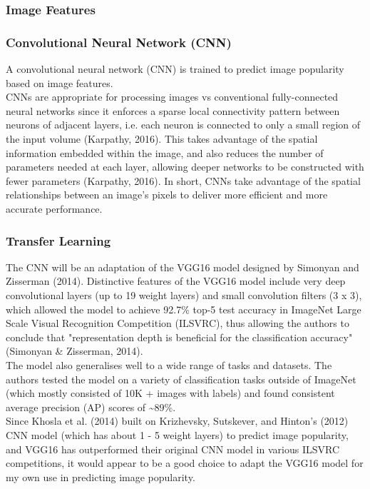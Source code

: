 \documentclass[11pt]{article}
\begin{document}
\subsubsection{Image Features}

\subsubsection*{Convolutional Neural Network (CNN)}

A convolutional neural network (CNN) is trained to predict image
popularity based on image features.\\

CNNs are appropriate for processing images vs conventional
fully-connected neural networks since it enforces a sparse local
connectivity pattern between neurons of adjacent layers, i.e. each
neuron is connected to only a small region of the input volume
(Karpathy, 2016). This takes advantage of the spatial information
embedded within the image, and also reduces the number of parameters
needed at each layer, allowing deeper networks to be constructed with
fewer parameters (Karpathy, 2016). In short, CNNs take advantage of the spatial relationships between an
image's pixels to deliver more efficient and more accurate performance.

\subsubsection*{Transfer Learning}

The CNN will be an adaptation of the VGG16 model designed by Simonyan
and Zisserman (2014). Distinctive features of the VGG16 model include
very deep convolutional layers (up to 19 weight layers) and small
convolution filters (3 x 3), which allowed the model to achieve 92.7\%
top-5 test accuracy in ImageNet Large Scale Visual Recognition
Competition (ILSVRC), thus allowing the authors to conclude that
"representation depth is beneficial for the classification accuracy"
(Simonyan \& Zisserman, 2014).\\

The model also generalises well to a wide range of tasks and datasets.
The authors tested the model on a variety of classification tasks
outside of ImageNet (which mostly consisted of 10K + images with labels)
and found consistent average precision (AP) scores of
\textasciitilde{}89\%.\\

Since Khosla et al. (2014) built on Krizhevsky, Sutskever, and Hinton's (2012)
CNN model (which has about 1 - 5 weight layers) to predict image
popularity, and VGG16 has outperformed their original CNN model in
various ILSVRC competitions, it would appear to be a good choice to
adapt the VGG16 model for my own use in predicting image popularity.\\
\end{document}
